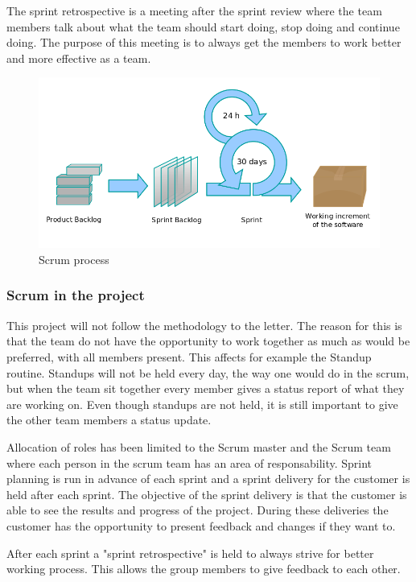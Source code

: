The sprint retrospective is a meeting after the sprint review where the team members talk about what 
the team should start doing, stop doing and continue doing. The purpose of this meeting is to always 
get the members to work better and more effective as a team. \cite{wikiAgile}

\begin{figure}[!ht]
    \includegraphics[scale=0.4]{pictures/Scrumprocess.png}
    \caption{Scrum process}
\end{figure}

\subsubsection{Scrum in the project}

This project will not follow the methodology to the letter. The reason for this is that the team do 
not have the opportunity to work together as much as would be preferred, with all members present. This affects
for example the Standup routine. Standups will not be held every day, the way one would do in the scrum,
but when the team sit together every member gives a status report of what they are working on. Even though standups are not held, it is still important to give the other team members a status update.

Allocation of roles has been limited to the Scrum master and the Scrum team where each person in the scrum team has an area of responsability. Sprint planning is run in advance of each sprint and a sprint delivery for the customer 
is held after each sprint. The objective of the sprint delivery is that the customer is able to see the results and progress of the project. During these deliveries the customer has the opportunity to present feedback and changes 
if they want to.

After each sprint a "sprint retrospective" is held to always strive for better working 
process. This allows the group members to give feedback to each other.

